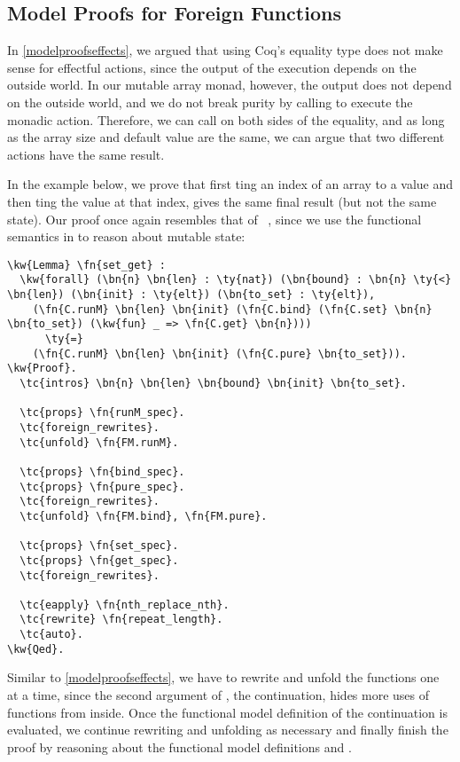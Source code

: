 \subsection{Model Proofs for Foreign Functions}

In \autoref{modelproofseffects}, we argued that using Coq's equality type \ty{=} does not make sense for effectful actions, since the output of the execution depends on the outside world. In our mutable array monad, however, the output does not depend on the outside world, and we do not break purity by calling  to execute the monadic action. Therefore, we can call  on both sides of the equality, and as long as the array size and default value are the same, we can argue that two different actions have the same result.

In the example below, we prove that first ting an index of an array to a value and then ting the value at that index, gives the same final result (but not the same state). Our proof once again resembles that of \citeauthor{swierstra2007beauty}~\cite{swierstra2007beauty}, since we use the functional semantics in  to reason about mutable state:

\begin{Verbatim}
\kw{Lemma} \fn{set_get} :
  \kw{forall} (\bn{n} \bn{len} : \ty{nat}) (\bn{bound} : \bn{n} \ty{<} \bn{len}) (\bn{init} : \ty{elt}) (\bn{to_set} : \ty{elt}),
    (\fn{C.runM} \bn{len} \bn{init} (\fn{C.bind} (\fn{C.set} \bn{n} \bn{to_set}) (\kw{fun} _ => \fn{C.get} \bn{n})))
      \ty{=}
    (\fn{C.runM} \bn{len} \bn{init} (\fn{C.pure} \bn{to_set})).
\kw{Proof}.
  \tc{intros} \bn{n} \bn{len} \bn{bound} \bn{init} \bn{to_set}.

  \tc{props} \fn{runM_spec}.
  \tc{foreign_rewrites}.
  \tc{unfold} \fn{FM.runM}.

  \tc{props} \fn{bind_spec}.
  \tc{props} \fn{pure_spec}.
  \tc{foreign_rewrites}.
  \tc{unfold} \fn{FM.bind}, \fn{FM.pure}.

  \tc{props} \fn{set_spec}.
  \tc{props} \fn{get_spec}.
  \tc{foreign_rewrites}.

  \tc{eapply} \fn{nth_replace_nth}.
  \tc{rewrite} \fn{repeat_length}.
  \tc{auto}.
\kw{Qed}.
\end{Verbatim}

Similar to \autoref{modelproofseffects}, we have to rewrite and unfold the  functions one at a time, since the second argument of , the continuation, hides more uses of functions from  inside. Once the \gls{functional model} definition of the continuation is evaluated, we continue rewriting and unfolding as necessary and finally finish the proof by reasoning about the \gls{functional model} definitions  and .